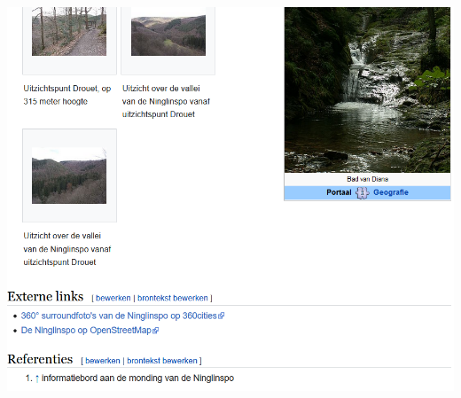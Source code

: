 \documentclass[../presentatie.tex]{subfiles}
\begin{document}
\begin{frame}
\begin{columns}
\begin{column}{0.6\textwidth}
                \includegraphics[width=\linewidth,height=0.85\textheight,keepaspectratio]{assets/wikipediaVisual3}
            \end{column}
        \end{columns}
    \end{frame}
\end{document}
